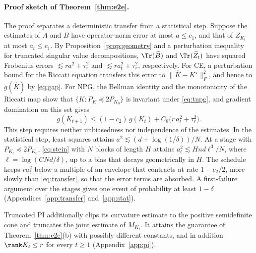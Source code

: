 \paragraph{Proof sketch of Theorem~\ref{thm:e2e}.}
The proof separates a deterministic transfer from a statistical step.
Suppose the estimates of $A$ and $B$ have operator-norm error at most
$a\le c_1$, and that of $Z_{K_t}$ at most $a_t\le c_1$. By
Proposition~\ref{prop:geometry} and a perturbation inequality for
truncated singular value decompositions, $\Tr(\widehat B)$ and
$\Tr(\widehat Z_t)$ have squared Frobenius errors
$\lesssim ra^2+\tau_r^2$ and $\lesssim ra_t^2+\tau_r^2$, respectively. For CE, a perturbation
bound for the Riccati equation transfers this error to
$\|\widehat K-K^\star\|_F^2$, and hence to $g(\widehat K)$ by
\eqref{eq:gap}. For NPG, the Bellman identity and the monotonicity of
the Riccati map show that $\{K:P_K\preceq2P_{K_0}\}$ is invariant under
\eqref{eq:tnpg}, and gradient domination on this set gives
\begin{equation}\label{eq:transfer}
 g(K_{t+1})\le(1-c_2)\,g(K_t)+C_8\bigl(r\,a_t^2+\tau_r^2\bigr).
\end{equation}
This step requires neither unbiasedness nor independence of the
estimates. In the statistical step, least squares attains
$a^2\lesssim(d+\log(1/\delta))/N$. At a stage with
$P_{K_t}\preceq2P_{K_0}$, \eqref{eq:stein} with $N$ blocks of length $H$
attains $a_t^2\lesssim Hnd\ell^3/N$, where $\ell=\log(CNd/\delta)$, up to
a bias that decays geometrically in $H$. The schedule keeps $ra_t^2$
below a multiple of an envelope that contracts at rate $1-c_2/2$, more
slowly than \eqref{eq:transfer}, so that the error terms are absorbed.
A first-failure argument over the stages gives one event of probability
at least $1-\delta$ (Appendices~\ref{app:transfer} and~\ref{app:stat}).

\begin{remark}\label{rem:pi-upper}
Truncated PI additionally clips its curvature estimate to the positive
semidefinite cone and truncates the joint estimate of $M_{K_t}$. It
attains the guarantee of Theorem~\ref{thm:e2e}(b) with possibly
different constants, and in addition
$\rank K_t\le r$ for every $t\ge1$ (Appendix~\ref{app:pi}).
\end{remark}
